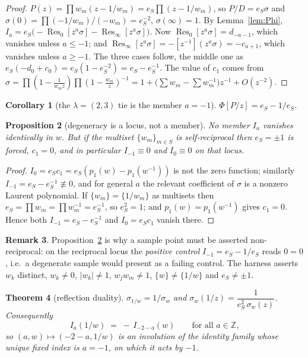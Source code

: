 \documentclass[11pt]{article}
\newtheorem{theorem}{Theorem}
\newtheorem{proposition}[theorem]{Proposition}
\newtheorem{corollary}[theorem]{Corollary}
\theoremstyle{definition}
\newtheorem{remark}[theorem]{Remark}
\theoremstyle{remark}
\DeclareMathOperator{\Res}{Res}
\begin{document}
\begin{proof}
$P(z)=\prod w_m(z-1/w_m)=e_S\prod(z-1/w_m)$, so $P/D=e_S\sigma$ and
$\sigma(0)=\prod(-1/w_m)/(-w_m)=e_S^{-2}$, $\sigma(\infty)=1$. By Lemma~\ref{lem:Phi},
$I_a=e_S\bigl(-\Res_0[z^a\sigma]-\Res_\infty[z^a\sigma]\bigr)$. Now
$\Res_0[z^a\sigma]=d_{-a-1}$, which vanishes unless $a\le-1$; and
$\Res_\infty[z^a\sigma]=-[z^{-1}](z^a\sigma)=-c_{a+1}$, which vanishes unless $a\ge-1$.
The three cases follow, the middle one as
$e_S(-d_0+c_0)=e_S(1-e_S^{-2})=e_S-e_S^{-1}$. The value of $c_1$ comes from
$\sigma=\prod(1-\tfrac{1}{w_mz})\prod(1-\tfrac{w_m}{z})^{-1}
=1+\bigl(\sum w_m-\sum w_m^{-1}\bigr)z^{-1}+O(z^{-2})$.
\end{proof}

\begin{corollary}[the $\lambda=(2,3)$ tie is the member $a=-1$]
$\Phi[P/z]=e_S-1/e_S$.
\end{corollary}

\begin{proposition}[degeneracy is a locus, not a member]\label{prop:deg}
No member $I_a$ vanishes identically in $w$. But if the multiset $\{w_m\}_{m\in S}$ is
self-reciprocal then $e_S=\pm1$ is forced, $c_1=0$, and in particular $I_{-1}\equiv0$ and
$I_0\equiv0$ on that locus.
\end{proposition}

\begin{proof}
$I_0=e_Sc_1=e_S(p_1(w)-p_1(w^{-1}))$ is not the zero function; similarly
$I_{-1}=e_S-e_S^{-1}\not\equiv0$, and for general $a$ the relevant coefficient of
$\sigma$ is a nonzero Laurent polynomial. If $\{w_m\}=\{1/w_m\}$ as multisets then
$e_S=\prod w_m=\prod w_m^{-1}=e_S^{-1}$, so $e_S^2=1$; and $p_1(w)=p_1(w^{-1})$ gives
$c_1=0$. Hence both $I_{-1}=e_S-e_S^{-1}$ and $I_0=e_Sc_1$ vanish there.
\end{proof}

\begin{remark}
Proposition~\ref{prop:deg} is why a sample point must be asserted non-reciprocal: on the
reciprocal locus the \emph{positive control} $I_{-1}=e_S-1/e_S$ reads $0=0$, i.e.\ a
degenerate sample would present as a failing control. The harness asserts
$w_k$ distinct, $w_k\neq0$, $|w_k|\neq1$, $w_jw_m\neq1$, $\{w\}\neq\{1/w\}$ and
$e_S\neq\pm1$.
\end{remark}

\begin{theorem}[reflection duality]\label{thm:dual}
$\sigma_{1/w}=1/\sigma_w$ and $\sigma_w(1/z)=\dfrac{1}{e_S^2\,\sigma_w(z)}$. Consequently
\[
  I_a(1/w)\;=\;-\,I_{-2-a}(w)\qquad\text{for all }a\in\mathbb{Z},
\]
so $(a,w)\mapsto(-2-a,1/w)$ is an involution of the identity family whose unique fixed
index is $a=-1$, on which it acts by $-1$.
\end{theorem}
\end{document}
